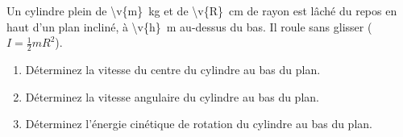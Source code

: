 Un cylindre plein de \qty{\v{m}}{kg} et de \qty{\v{R}}{cm} de rayon est lâché du repos en haut d'un plan incliné, à \qty{\v{h}}{m} au-dessus du bas. Il roule sans glisser ($I = \tfrac{1}{2}mR^2$).

\begin{enumerate}[label=\alph*)]
    \item Déterminez la vitesse du centre du cylindre au bas du plan.
    \item Déterminez la vitesse angulaire du cylindre au bas du plan.
    \item Déterminez l'énergie cinétique de rotation du cylindre au bas du plan.
\end{enumerate}
